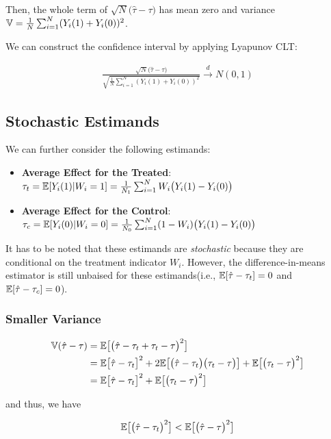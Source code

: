 Then, the whole term of $\sqrt{N}\bigl(\hat\tau - \tau\bigr)$ has mean zero and variance ${\mathbb{V}} = \frac{1}{N} \sum_{i=1}^N (Y_i(1) + Y_i(0))^2$.

We can construct the confidence interval by applying Lyapunov CLT:

\begin{align}
    \frac{\sqrt{N}\bigl(\hat\tau - \tau\bigr)}{\sqrt{\frac{1}{N} \sum_{i=1}^N (Y_i(1) + Y_i(0))^2}} \xrightarrow{d} N(0, 1)
\end{align}

\subsection{Stochastic Estimands}

We can further consider the following estimands:

\begin{itemize}
    \item \textbf{Average Effect for the Treated}: $\tau_t = {\mathbb{E}}[Y_i(1) | W_i = 1] = \frac{1}{N_1}\sum_{i=1}^N W_i\bigl(Y_i(1) - Y_i(0)\bigr)$
    \item \textbf{Average Effect for the Control}: $\tau_c = {\mathbb{E}}[Y_i(0) | W_i = 0] = \frac{1}{N_0}\sum_{i=1}^N (1-W_i)\bigl(Y_i(1) - Y_i(0)\bigr)$
\end{itemize}

It has to be noted that these estimands are \textit{stochastic} because they are conditional on the treatment indicator $W_i$.
However, the difference-in-means estimator is still unbaised for these estimands(i.e., ${\mathbb{E}}[\hat\tau-\tau_t] = 0$ and ${\mathbb{E}}[\hat\tau-\tau_c] = 0$).

\subsubsection{Smaller Variance}

\begin{align}
    {\mathbb{V}}(\hat\tau - \tau) &= {\mathbb{E}}\bigl[\bigl(\hat\tau - \tau_t + \tau_t - \tau\bigr)^2\bigr]\\
    &={\mathbb{E}}\bigl[\hat\tau - \tau_t\bigr]^2 + 2{\mathbb{E}}\bigl[\bigl(\hat\tau - \tau_t\bigr)\bigl(\tau_t - \tau\bigr)\bigr] + {\mathbb{E}}\bigl[\bigl(\tau_t - \tau\bigr)^2\bigr]\\
    &= {\mathbb{E}}\bigl[\hat\tau - \tau_t\bigr]^2 + {\mathbb{E}}\bigl[\bigl(\tau_t - \tau\bigr)^2\bigr]
\end{align}

and thus, we have

\begin{align}
    {\mathbb{E}}\bigl[\bigl(\hat\tau - \tau_t\bigr)^2\bigr] < {\mathbb{E}}\bigl[\bigl(\hat\tau - \tau\bigr)^2\bigr]
\end{align}



